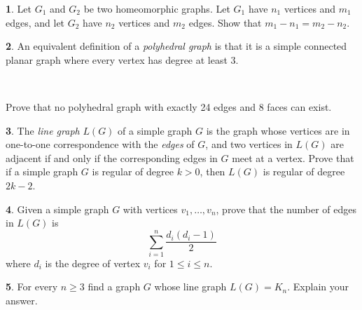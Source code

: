 \documentclass[12pt]{article}
\theoremstyle{definition}
\newtheorem{problem}{}
\begin{document}
\begin{problem}
Let $G_1$ and $G_2$ be two homeomorphic graphs. Let $G_1$ have $n_1$ vertices and $m_1$ edges, and let $G_2$ have $n_2$ vertices and $m_2$ edges. Show that $m_1-n_1=m_2-n_2$.
\end{problem}

\begin{problem} An equivalent definition of a \emph{polyhedral graph} is that it is a simple connected planar graph where every vertex has degree at least 3.

\

\begin{center}Prove that no polyhedral graph with exactly 24 edges and 8 faces can exist.\end{center}
\end{problem}





\begin{problem}
The \emph{line graph} $L(G)$ of a simple graph $G$ is the graph whose vertices are in one-to-one correspondence with the \emph{edges} of $G$, and two vertices in $L(G)$ are adjacent if and only if the corresponding edges in $G$ meet at a vertex. Prove that if a simple graph $G$ is regular of degree $k>0$, then $L(G)$ is regular of degree $2k-2$. 
\end{problem}

\begin{problem}
Given a simple graph $G$ with vertices $v_1, \ldots , v_n$, prove that the number of edges in $L(G)$ is
$$\sum _{i=1} ^n \frac{d_i(d_i - 1)}{2}$$where $d_i$ is the degree of vertex $v_i$ for $1\leq i \leq n$.
\end{problem}

\begin{problem}
For every $n\geq 3$ find a graph $G$ whose line graph $L(G)=K_n$. Explain your answer.
\end{problem}
\end{document}
